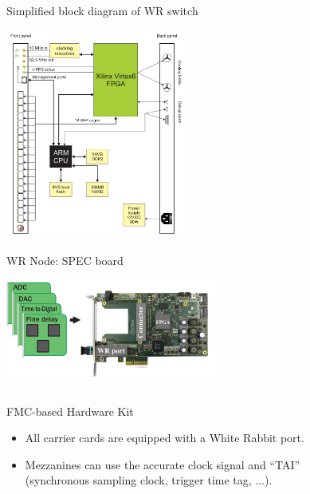 \documentclass[compress, red]{beamer}
\begin{document}
\begin{frame}{Simplified block diagram of WR switch}
 \begin{center}
   \includegraphics[height=6.9cm]{switch/switch_simple_diagram.pdf}
 \end{center} 
\end{frame}


\begin{frame}{WR Node: SPEC board}
    \begin{center}
    \includegraphics[width=7cm]{node/spec.jpg}
    \end{center}

  \begin{columns}[c]

	\begin{block}{FMC-based Hardware Kit}
	  \begin{itemize}
	  \item All carrier cards are equipped with a White Rabbit port.
	  \item Mezzanines can use the accurate clock signal and ``TAI''
		\\ (synchronous sampling clock, trigger time tag, ...).
	  \end{itemize}
	\end{block}

  \end{columns}
\end{frame}
\end{document}
